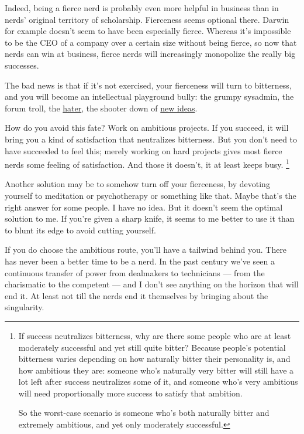 \documentclass[12pt]{book}
\begin{document}
Indeed, being a fierce nerd is probably even more helpful in business
than in nerds' original territory of scholarship. Fierceness seems
optional there. Darwin for example doesn't seem to have been especially
fierce. Whereas it's impossible to be the CEO of a company over a
certain size without being fierce, so now that nerds can win at
business, fierce nerds will increasingly monopolize the really big
successes.

The bad news is that if it's not exercised, your fierceness will turn to
bitterness, and you will become an intellectual playground bully: the
grumpy sysadmin, the forum troll, the \href{fh.html}{hater}, the shooter
down of \href{newideas.html}{new ideas}.

How do you avoid this fate? Work on ambitious projects. If you succeed,
it will bring you a kind of satisfaction that neutralizes bitterness.
But you don't need to have succeeded to feel this; merely working on
hard projects gives most fierce nerds some feeling of satisfaction. And
those it doesn't, it at least keeps busy. \footnote{If success neutralizes bitterness, why are there some people who
are at least moderately successful and yet still quite bitter? Because
people's potential bitterness varies depending on how naturally bitter
their personality is, and how ambitious they are: someone who's
naturally very bitter will still have a lot left after success
neutralizes some of it, and someone who's very ambitious will need
proportionally more success to satisfy that ambition.

So the worst-case scenario is someone who's both naturally bitter and
extremely ambitious, and yet only moderately successful.}

Another solution may be to somehow turn off your fierceness, by devoting
yourself to meditation or psychotherapy or something like that. Maybe
that's the right answer for some people. I have no idea. But it doesn't
seem the optimal solution to me. If you're given a sharp knife, it seems
to me better to use it than to blunt its edge to avoid cutting yourself.

If you do choose the ambitious route, you'll have a tailwind behind you.
There has never been a better time to be a nerd. In the past century
we've seen a continuous transfer of power from dealmakers to technicians
--- from the charismatic to the competent --- and I don't see anything
on the horizon that will end it. At least not till the nerds end it
themselves by bringing about the singularity.
\end{document}
